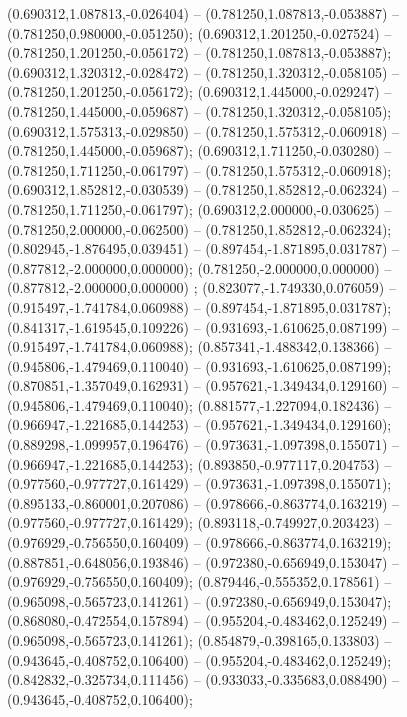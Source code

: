  (0.690312,1.087813,-0.026404) -- (0.781250,1.087813,-0.053887) -- (0.781250,0.980000,-0.051250);
 (0.690312,1.201250,-0.027524) -- (0.781250,1.201250,-0.056172) -- (0.781250,1.087813,-0.053887);
 (0.690312,1.320312,-0.028472) -- (0.781250,1.320312,-0.058105) -- (0.781250,1.201250,-0.056172);
 (0.690312,1.445000,-0.029247) -- (0.781250,1.445000,-0.059687) -- (0.781250,1.320312,-0.058105);
 (0.690312,1.575313,-0.029850) -- (0.781250,1.575312,-0.060918) -- (0.781250,1.445000,-0.059687);
 (0.690312,1.711250,-0.030280) -- (0.781250,1.711250,-0.061797) -- (0.781250,1.575312,-0.060918);
 (0.690312,1.852812,-0.030539) -- (0.781250,1.852812,-0.062324) -- (0.781250,1.711250,-0.061797);
 (0.690312,2.000000,-0.030625) -- (0.781250,2.000000,-0.062500) -- (0.781250,1.852812,-0.062324);
 (0.802945,-1.876495,0.039451) -- (0.897454,-1.871895,0.031787) -- (0.877812,-2.000000,0.000000);
 (0.781250,-2.000000,0.000000) -- (0.877812,-2.000000,0.000000) ;
 (0.823077,-1.749330,0.076059) -- (0.915497,-1.741784,0.060988) -- (0.897454,-1.871895,0.031787);
 (0.841317,-1.619545,0.109226) -- (0.931693,-1.610625,0.087199) -- (0.915497,-1.741784,0.060988);
 (0.857341,-1.488342,0.138366) -- (0.945806,-1.479469,0.110040) -- (0.931693,-1.610625,0.087199);
 (0.870851,-1.357049,0.162931) -- (0.957621,-1.349434,0.129160) -- (0.945806,-1.479469,0.110040);
 (0.881577,-1.227094,0.182436) -- (0.966947,-1.221685,0.144253) -- (0.957621,-1.349434,0.129160);
 (0.889298,-1.099957,0.196476) -- (0.973631,-1.097398,0.155071) -- (0.966947,-1.221685,0.144253);
 (0.893850,-0.977117,0.204753) -- (0.977560,-0.977727,0.161429) -- (0.973631,-1.097398,0.155071);
 (0.895133,-0.860001,0.207086) -- (0.978666,-0.863774,0.163219) -- (0.977560,-0.977727,0.161429);
 (0.893118,-0.749927,0.203423) -- (0.976929,-0.756550,0.160409) -- (0.978666,-0.863774,0.163219);
 (0.887851,-0.648056,0.193846) -- (0.972380,-0.656949,0.153047) -- (0.976929,-0.756550,0.160409);
 (0.879446,-0.555352,0.178561) -- (0.965098,-0.565723,0.141261) -- (0.972380,-0.656949,0.153047);
 (0.868080,-0.472554,0.157894) -- (0.955204,-0.483462,0.125249) -- (0.965098,-0.565723,0.141261);
 (0.854879,-0.398165,0.133803) -- (0.943645,-0.408752,0.106400) -- (0.955204,-0.483462,0.125249);
 (0.842832,-0.325734,0.111456) -- (0.933033,-0.335683,0.088490) -- (0.943645,-0.408752,0.106400);
